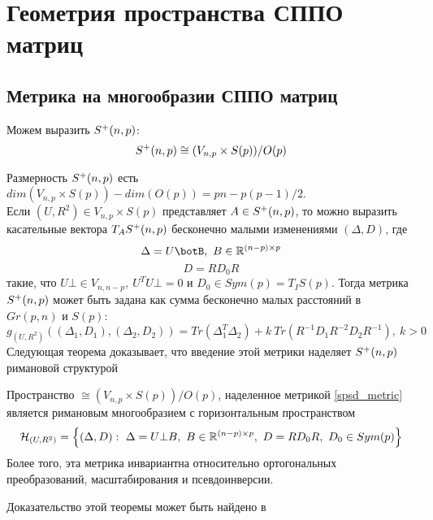 \section{Геометрия пространства СППО матриц}
\subsection{Метрика на многообразии СППО матриц}
Можем выразить $S^+(n,p)$: 
$$ S^+(n,p) \cong (V_{n,p} \times S(p))/O(p) $$

Размерность $S^+(n,p)$ есть $dim(V_{n,p} \times S(p)) - dim(O(p))=pn-p(p-1)/2$. \\
Если $(U, R^2) \in V_{n,p} \times S(p)$ представляет $A \in S^+(n,p)$, то можно выразить касательные вектора $T_AS^+(n,p)$ бесконечно малыми изменениями $(\Delta, D)$, где 
$$ \Delta = U\botB, \ B \in \setR^{(n-p) \times p} $$
$$ D = RD_0R $$
такие, что $U \bot \in V_{n, n-p}, \ U^TU\bot = 0$ и $D_0 \in Sym(p) = T_IS(p)$. Тогда метрика $S^+(n,p)$ может быть задана как сумма бесконечно малых расстояний в $Gr(p,n)$ и $S(p)$:
\begin{equation}\label{spsd_metric}
     g_{(U, R^2)}((\Delta_1, D_1), (\Delta_2, D_2)) = Tr(\Delta_1^T \Delta_2) + k \ Tr(R^{-1}D_1R^{-2}D_2R^{-1}), \ k>0
\end{equation}
Следующая теорема доказывает, что введение этой метрики наделяет $S^+(n,p)$ римановой структурой
\begin{theorem}
Пространство $ $\spn$ \cong (V_{n,p} \times S(p))/O(p) $, наделенное метрикой \eqref{spsd_metric} является римановым многообразием с горизонтальным пространством 
$$ \manH_{(U, R^2)} = \set{(\Delta, D):\ \Delta=U\bot B, \ B \in \setR^{(n-p) \times p},\ D=RD_0R, \ D_0 \in Sym(p)} $$
Более того, эта метрика инвариантна относительно ортогональных преобразований, масштабирования и псевдоинверсии.
\end{theorem}
Доказательство этой теоремы может быть найдено в \cite{bonnabel2009riemannian}
\newpage

